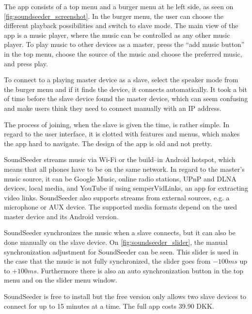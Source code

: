 The app consists of a top menu and a burger menu at he left side, as seen on \cref{fig:soundseeder_screenshot}.
In the burger menu, the user can choose the different playback possibilities and switch to slave mode.
The main view of the app is a music player, where the music can be controlled as any other music player. 
To play music to other devices as a master, press the ``add music button'' in the top menu,
choose the source of the music and choose the preferred music, and press play. 

To connect to a playing master device as a slave, select the speaker mode from the burger menu and if it finds the device, it connects automatically.
It took a bit of time before the slave device found the master device, which can seem confusing and make users think they need to connect manually with an IP address. 

The process of joining, when the slave is given the time, is rather simple.
In regard to the user interface, it is clotted with features and menus, which makes the app hard to navigate.
The design of the app is old and not pretty.

SoundSeeder streams music via Wi-Fi or the build--in Android hotspot, 
which means that all phones have to be on the same network\cite{soundseether_faq}.
In regard to the master's music source, it can be Google Music, online radio stations, UPnP and DLNA devices, local media, and YouTube if using semperVidLinks, an app for extracting video links.
SoundSeeder also supports streams from external sources, e.g. a microphone or AUX device. 
The supported media formats depend on the used master device and its Android version.\cite{soundseether_faq}

SoundSeeder synchronizes the music when a slave connects, but it can also be done manually on the slave device. 
On \cref{fig:soundseeder_slider}, the manual synchronization adjustment for SoundSeeder can be seen.
This slider is used in the case that the music is not fully synchronized, the slider goes from $-100 ms$ up to $+100 ms$.
Furthermore there is also an auto synchronization button in the top menu and on the slider menu window. 

SoundSeeder is free to install but the free version only allows two slave devices to connect for up to 15 minutes at a time.
The full app costs 39.90 DKK. 

